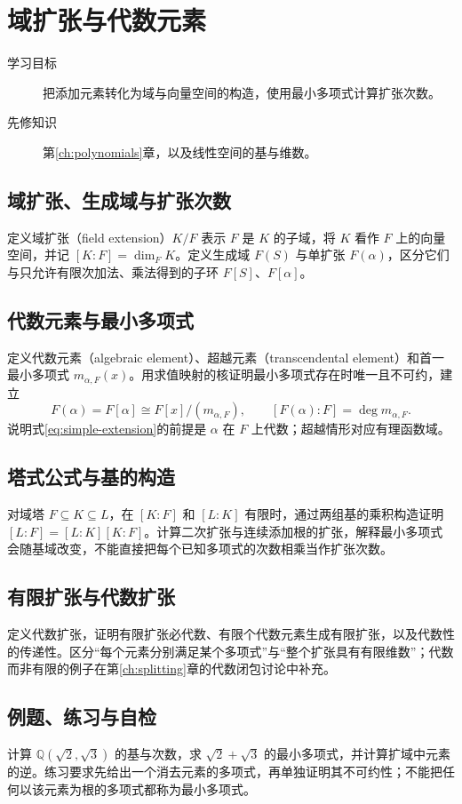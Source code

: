 \setcounter{chapter}{13} %
\chapter{域扩张与代数元素}\label{ch:extensions}

\begin{description}
  \item[学习目标] 把添加元素转化为域与向量空间的构造，使用最小多项式计算扩张次数。
  \item[先修知识] 第\ref{ch:polynomials}章，以及线性空间的基与维数。
\end{description}

\section{域扩张、生成域与扩张次数}
定义域扩张（field extension）$K/F$ 表示 $F$ 是 $K$ 的子域，将 $K$ 看作 $F$ 上的向量空间，并记 $[K:F]=\dim_FK$。定义生成域 $F(S)$ 与单扩张 $F(\alpha)$，区分它们与只允许有限次加法、乘法得到的子环 $F[S]$、$F[\alpha]$。

\section{代数元素与最小多项式}
定义代数元素（algebraic element）、超越元素（transcendental element）和首一最小多项式 $m_{\alpha,F}(x)$。用求值映射的核证明最小多项式存在时唯一且不可约，建立
\begin{equation}\label{eq:simple-extension}
  F(\alpha)=F[\alpha]\cong F[x]/(m_{\alpha,F}),
  \qquad [F(\alpha):F]=\deg m_{\alpha,F}.
\end{equation}
说明式\eqref{eq:simple-extension}的前提是 $\alpha$ 在 $F$ 上代数；超越情形对应有理函数域。

\section{塔式公式与基的构造}
对域塔 $F\subseteq K\subseteq L$，在 $[K:F]$ 和 $[L:K]$ 有限时，通过两组基的乘积构造证明 $[L:F]=[L:K][K:F]$。计算二次扩张与连续添加根的扩张，解释最小多项式会随基域改变，不能直接把每个已知多项式的次数相乘当作扩张次数。

\section{有限扩张与代数扩张}
定义代数扩张，证明有限扩张必代数、有限个代数元素生成有限扩张，以及代数性的传递性。区分“每个元素分别满足某个多项式”与“整个扩张具有有限维数”；代数而非有限的例子在第\ref{ch:splitting}章的代数闭包讨论中补充。

\section{例题、练习与自检}
计算 $\mathbb Q(\sqrt2,\sqrt3)$ 的基与次数，求 $\sqrt2+\sqrt3$ 的最小多项式，并计算扩域中元素的逆。练习要求先给出一个消去元素的多项式，再单独证明其不可约性；不能把任何以该元素为根的多项式都称为最小多项式。

